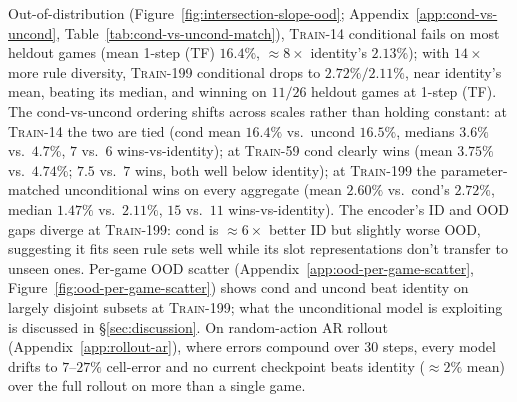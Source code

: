 Out-of-distribution (Figure~\ref{fig:intersection-slope-ood};
Appendix~\ref{app:cond-vs-uncond}, Table~\ref{tab:cond-vs-uncond-match}),
\textsc{Train-14} conditional fails on most heldout games (mean 1-step
(TF) $16.4\%$, $\approx 8\times$ identity's $2.13\%$); with $14\times$
more rule diversity, \textsc{Train-199} conditional drops to $2.72\% /
2.11\%$, near identity's mean, beating its median, and winning on
$11/26$ heldout games at 1-step (TF). The cond-vs-uncond ordering
shifts across scales rather than holding constant: at \textsc{Train-14}
the two are tied (cond mean $16.4\%$ vs.\ uncond $16.5\%$, medians
$3.6\%$ vs.\ $4.7\%$, $7$ vs.\ $6$ wins-vs-identity); at
\textsc{Train-59} cond clearly wins (mean $3.75\%$ vs.\ $4.74\%$;
$7.5$ vs.\ $7$ wins, both well below identity); at \textsc{Train-199}
the parameter-matched unconditional wins on every aggregate
(mean $2.60\%$ vs.\ cond's $2.72\%$, median $1.47\%$ vs.\ $2.11\%$,
$15$ vs.\ $11$ wins-vs-identity).
The encoder's ID and OOD gaps diverge at \textsc{Train-199}: cond is
$\approx 6\times$ better ID but slightly worse OOD, suggesting it
fits seen rule sets well while its slot representations don't
transfer to unseen ones. Per-game OOD scatter
(Appendix~\ref{app:ood-per-game-scatter},
Figure~\ref{fig:ood-per-game-scatter}) shows cond and uncond beat
identity on largely disjoint subsets at \textsc{Train-199}; what
the unconditional model is exploiting is discussed in
\S\ref{sec:discussion}.
On random-action AR rollout
(Appendix~\ref{app:rollout-ar}), where errors compound over 30 steps,
every model drifts to $7$--$27\%$ cell-error and no current
checkpoint beats identity ($\approx 2\%$ mean) over the full rollout
on more than a single game.

